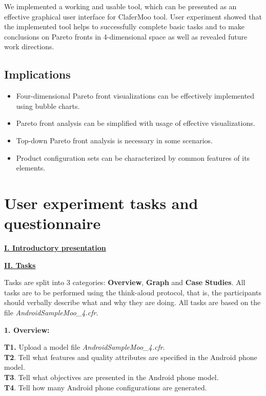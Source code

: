\documentclass{acm_proc_article-sp}
\begin{document}
We implemented a working and usable tool, which can be presented as an effective graphical user interface for ClaferMoo tool. User experiment showed that the implemented tool helps to successfully complete basic tasks and to make conclusions on Pareto fronts in 4-dimensional space as well as revealed future work directions.

\subsection{Implications}

\begin{itemize}
\item Four-dimensional Pareto front visualizations can be effectively implemented using bubble charts.
\item Pareto front analysis can be simplified with usage of effective visualizations.
\item Top-down Pareto front analysis is necessary in some scenarios.
\item Product configuration sets can be characterized by common features of its elements.
\end{itemize}

{}


\appendix
\section{User experiment tasks and questionnaire} \label{A}

\underline{ \textbf{I. Introductory presentation}}

\underline{ \textbf{II. Tasks}}

Tasks are split into 3 categories: \textbf{Overview}, \textbf{Graph} and \textbf{Case Studies}. All tasks are to be performed using the think-aloud protocol, that is, the participants should verbally describe what and why they are doing. All tasks are based on the file \textit{AndroidSampleMoo\_4.cfr}.

\textbf{1. Overview:}

\textbf{T1.} Upload a model file \textit{AndroidSampleMoo\_4.cfr}.\\
\textbf{T2}. Tell what features and quality attributes are specified in the Android phone model.\\
\textbf{T3}. Tell what objectives are presented in the Android phone model.\\
\textbf{T4}. Tell how many Android phone configurations are generated.\\
\end{document}
